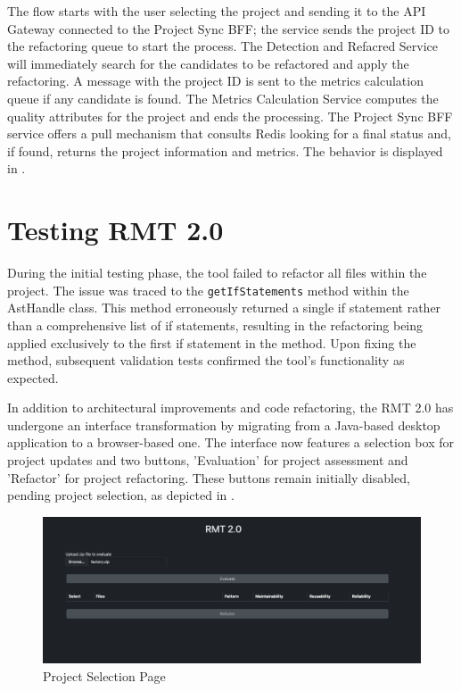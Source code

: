 The flow starts with the user selecting the project and sending it to the API Gateway connected to the Project Sync BFF; the service sends the project ID to the refactoring queue to start the process. The Detection and Refacred Service will immediately search for the candidates to be refactored and apply the refactoring. A message with the project ID is sent to the metrics calculation queue if any candidate is found. The Metrics Calculation Service computes the quality attributes for the project and ends the processing. The Project Sync BFF service offers a pull mechanism that consults Redis looking for a final status and, if found, returns the project information and metrics. The behavior is displayed in .

\section{Testing RMT 2.0}
\label{sec-tests-2.0}

During the initial testing phase, the tool failed to refactor all files within the project. The issue was traced to the \texttt{getIfStatements} method within the AstHandle class. This method erroneously returned a single if statement rather than a comprehensive list of if statements, resulting in the refactoring being applied exclusively to the first if statement in the \cite{Liu2014} method. Upon fixing the method, subsequent validation tests confirmed the tool's functionality as expected.

In addition to architectural improvements and code refactoring, the RMT 2.0 has undergone an interface transformation by migrating from a Java-based desktop application to a browser-based one. The interface now features a selection box for project updates and two buttons, 'Evaluation' for project assessment and 'Refactor' for project refactoring. These buttons remain initially disabled, pending project selection, as depicted in .

\begin{figure}[ht!]
\SetCaptionWidth{\textwidth}
\caption{Project Selection Page}
\label{fig-factory-start}
\includegraphics[width =\textwidth]{Chapter-5/Figures/rmt-factory-client-start.png}
\end{figure}
\FloatBarrier

